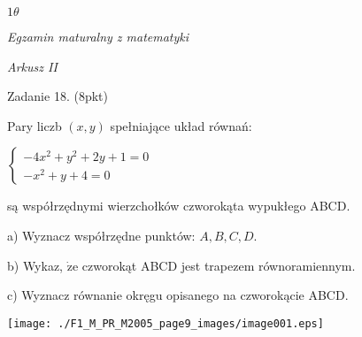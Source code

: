 \documentclass[a4paper,12pt]{article}
\begin{document}
$ 1\theta$

{\it Egzamin maturalny z matematyki}

{\it Arkusz II}

Zadanie 18. (8pkt)

Pary liczb $(x,y)$ spełniające układ równań:

$\left\{\begin{array}{l}
-4x^{2}+y^{2}+2y+1=0\\
-x^{2}+y+4=0
\end{array}\right.$

są współrzędnymi wierzchołków czworokąta wypukłego ABCD.

a) Wyznacz współrzędne punktów: $A, B, C, D.$

b) Wykaz, $\dot{\mathrm{z}}\mathrm{e}$ czworokąt ABCD jest trapezem równoramiennym.

c) Wyznacz równanie okręgu opisanego na czworokącie ABCD.
\begin{center}
\texttt{[image: ./F1\_M\_PR\_M2005\_page9\_images/image001.eps]}
\end{center}
\end{document}
